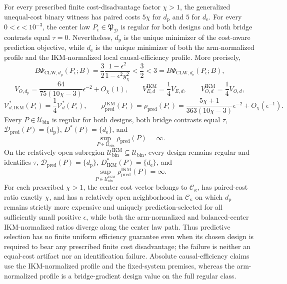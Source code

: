 For every prescribed finite cost-disadvantage factor \(\chi>1\), the generalized unequal-cost binary witness has paired costs \(5\chi\) for \(d_{\mathrm p}\) and \(5\) for \(d_{\mathrm e}\). For every \(0<\epsilon<10^{-3}\), the center law \(P_\epsilon\in\mathfrak P_{\mathcal D}\) is regular for both designs and both bridge contrasts equal \(\tau=0\). Nevertheless, \(d_{\mathrm p}\) is the unique minimizer of the cost-aware prediction objective, while \(d_{\mathrm e}\) is the unique minimizer of both the arm-normalized profile and the IKM-normalized local causal-efficiency profile. More precisely,
\[
 B\Psi_{\mathrm{CLW},d_{\mathrm p}}(P_\epsilon;B)
 =\frac32\frac{1-\epsilon^2}{1-\epsilon^2y_\chi^2}
 <\frac32<3
 =B\Psi_{\mathrm{CLW},d_{\mathrm e}}(P_\epsilon;B),
\]
\[
 V_{O,d_{\mathrm p}}
 =\frac{64}{75(10\chi-3)}\epsilon^{-2}+O_\chi(1),
 \qquad
 V_{E,d}^{\mathrm{IKM}}=\frac14V_{E,d},
 \qquad
 V_{O,d}^{\mathrm{IKM}}=\frac14V_{O,d},
\]
\[
 \mathcal V_{d,\mathrm{IKM}}^*(P_\epsilon)
 =\frac14\mathcal V_d^*(P_\epsilon),
 \qquad
 \rho_{\mathrm{pred}}^{\mathrm{IKM}}(P_\epsilon)
 =\rho_{\mathrm{pred}}(P_\epsilon)
 =\frac{5\chi+1}{363(10\chi-3)}\epsilon^{-2}
 +O_\chi(\epsilon^{-1}).
\]
Every \(P\in\mathcal U_{\mathrm{bin}}\) is regular for both designs, both bridge contrasts equal \(\tau\), \(\mathcal D_{\mathrm{pred}}(P)=\{d_{\mathrm p}\}\), \(D^*(P)=\{d_{\mathrm e}\}\), and
\[
 \sup_{P\in\mathcal U_{\mathrm{bin}}}\rho_{\mathrm{pred}}(P)=\infty.
\]
On the relatively open subregion \(\mathcal U_{\mathrm{bin}}^{\mathrm{IKM}}\subseteq\mathcal U_{\mathrm{bin}}\), every design remains regular and identifies \(\tau\), \(\mathcal D_{\mathrm{pred}}(P)=\{d_{\mathrm p}\}\), \(D_{\mathrm{IKM}}^*(P)=\{d_{\mathrm e}\}\), and
\[
 \sup_{P\in\mathcal U_{\mathrm{bin}}^{\mathrm{IKM}}}
 \rho_{\mathrm{pred}}^{\mathrm{IKM}}(P)=\infty.
\]
For each prescribed \(\chi>1\), the center cost vector belongs to \(\mathcal C_\kappa\), has paired-cost ratio exactly \(\chi\), and has a relatively open neighborhood in \(\mathcal C_\kappa\) on which \(d_{\mathrm p}\) remains strictly more expensive and uniquely prediction-selected for all sufficiently small positive \(\epsilon\), while both the arm-normalized and balanced-center IKM-normalized ratios diverge along the center law path. Thus predictive selection has no finite uniform efficiency guarantee even when its chosen design is required to bear any prescribed finite cost disadvantage; the failure is neither an equal-cost artifact nor an identification failure. Absolute causal-efficiency claims use the IKM-normalized profile and the fixed-system premises, whereas the arm-normalized profile is a bridge-gradient design value on the full regular class.